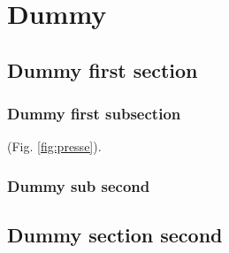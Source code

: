 \chapter{Dummy}
\lipsum[4-6]
\minitoc

\section{Dummy first section}



\subsection{Dummy first subsection}
\lipsum[2] (Fig. \ref{fig:presse}).


\subsection{Dummy sub second}

\section{Dummy section second}
